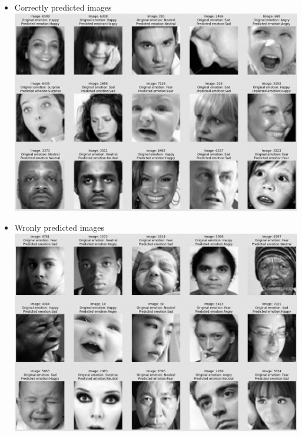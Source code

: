 \begin{itemize}
    \item Correctly predicted images\\
            \includegraphics[scale=0.50]{images/modelOne/trueOne.png}
    \item Wronly predicted images\\
            \includegraphics[scale=0.50]{images/modelOne/falseOne.png}
\end{itemize}
